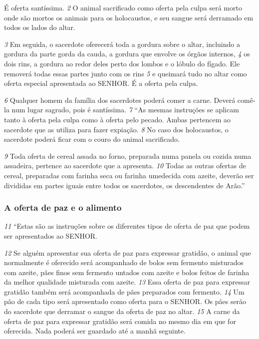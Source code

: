 \smallskip
É oferta santíssima. 
\textit{\tiny 2} 
O animal sacrificado como oferta pela culpa será morto onde são mortos os animais
para os holocaustos, e seu sangue será derramado em todos os lados do altar. 

\smallskip
\textit{\tiny 3} 
Em seguida, o sacerdote oferecerá toda a gordura sobre o altar, incluindo a gordura
da parte gorda da cauda, a gordura que envolve os órgãos internos, 
\textit{\tiny 4} 
os dois rins, a gordura ao redor deles perto dos lombos e o lóbulo do fígado. Ele removerá todas
essas partes junto com os rins 
\textit{\tiny 5} 
e queimará tudo no altar como oferta especial
apresentada ao SENHOR. É a oferta pela culpa. 

\smallskip
\textit{\tiny 6} 
Qualquer homem da família dos
sacerdotes poderá comer a carne. Deverá comê-la num lugar sagrado, pois é
santíssima. 
\textit{\tiny 7} 
“As mesmas instruções se aplicam tanto à oferta pela culpa como à oferta pelo
pecado. Ambas pertencem ao sacerdote que as utiliza para fazer expiação. 
\textit{\tiny 8} 
No caso dos holocaustos, o sacerdote poderá ficar com o couro do animal
sacrificado. 

\smallskip
\textit{\tiny 9} 
Toda oferta de cereal assada no forno, preparada numa panela ou
cozida numa assadeira, pertence ao sacerdote que a apresenta. 
\textit{\tiny 10}
Todas as outras
ofertas de cereal, preparadas com farinha seca ou farinha umedecida com azeite,
deverão ser divididas em partes iguais entre todos os sacerdotes, os descendentes
de Arão.”

\bigskip
\subsubsection*{A oferta de paz e o alimento}  
\textit{\tiny 11}
“Estas são as instruções sobre os diferentes tipos de oferta de paz que podem
ser apresentados ao SENHOR. 

\smallskip
\textit{\tiny 12}
Se alguém apresentar sua oferta de paz para
expressar gratidão, o animal que normalmente é oferecido será acompanhado de
bolos sem fermento misturados com azeite, pães finos sem fermento untados
com azeite e bolos feitos de farinha da melhor qualidade misturada com azeite.
\textit{\tiny 13}
Essa oferta de paz para expressar gratidão também será acompanhada de pães
preparados com fermento. 
\textit{\tiny 14}
Um pão de cada tipo será apresentado como oferta
para o SENHOR. Os pães serão do sacerdote que derramar o sangue da oferta de
paz no altar. 
\textit{\tiny 15}
A carne da oferta de paz para expressar gratidão será comida no
mesmo dia em que for oferecida. Nada poderá ser guardado até a manhã
seguinte.
   

